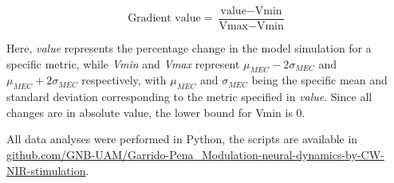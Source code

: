 \[\text{Gradient value} = \frac{\text{value} - \text{Vmin}}{\text{Vmax} - \text{Vmin}}\]

Here, \textit{value} represents the percentage change in the model simulation for a specific metric, while \textit{Vmin} and \textit{Vmax} represent $\mu_{MEC}-2\sigma_{MEC}$ and $\mu_{MEC}+2\sigma_{MEC}$ respectively, with $\mu_{MEC}$ and $\sigma_{MEC}$ being the specific mean and standard deviation corresponding to the metric specified in \textit{value}. Since all changes are in absolute value, the lower bound for Vmin is 0.

All data analyses were performed in Python, the scripts are available in \href{https://github.com/GNB-UAM/Garrido-Pena_Modulation-neural-dynamics-by-CW-NIR-stimulation}{github.com/GNB-UAM/Garrido-Pena\_Modulation-neural-dynamics-by-CW-NIR-stimulation}.


